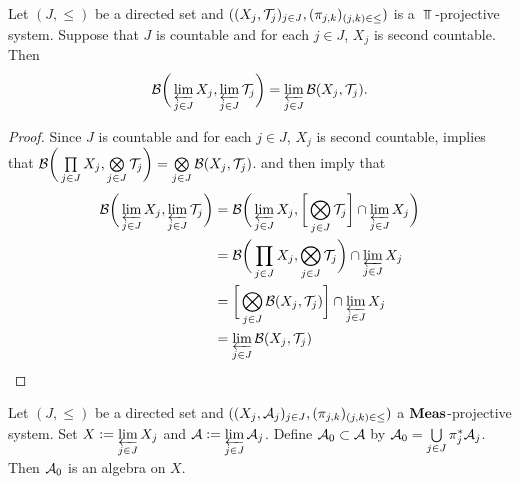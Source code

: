 \documentclass{book}
\begin{document}
\begin{ex} 
	Let $(J, \leq)$ be a directed set and $((X_j, \mathcal{T}_j)_{j \in J}, (\pi_{j,k})_{(j,k) \in \leq})$ is a $\Top$-projective system. Suppose that $J$ is countable and for each $j \in J$, $X_j$ is second countable. Then 
	$$\mathcal{B}\bigg(\varprojlim\limits_{j \in J} X_j, \varprojlim\limits_{j \in J} \mathcal{T}_j  \bigg) = \varprojlim\limits_{j \in J} \mathcal{B}(X_j, \mathcal{T}_j).$$
\end{ex}

\begin{proof}
	Since $J$ is countable and for each $j \in J$, $X_j$ is second countable,  implies that $\mathcal{B}\bigg(\prod\limits_{j \in J} X_j, \bigotimes\limits_{j \in J} \mathcal{T}_j \bigg) = \bigotimes\limits_{j \in J} \mathcal{B}(X_j, \mathcal{T}_j)$.  and  then imply that
	\begin{align*}
		\mathcal{B} \bigg(\varprojlim\limits_{j \in J} X_j, \varprojlim\limits_{j \in J} \mathcal{T}_j \bigg)
		& = \mathcal{B} \bigg(\varprojlim\limits_{j \in J} X_j, \bigg[ \bigotimes\limits_{j \in J} \mathcal{T}_j \bigg] \cap \varprojlim\limits_{j \in J} X_j \bigg) \\
		& = \mathcal{B}\bigg( \prod\limits_{j \in J} X_j, \bigotimes\limits_{j \in J} \mathcal{T}_j  \bigg) \cap \varprojlim\limits_{j \in J} X_j \\
		& = \bigg[ \bigotimes\limits_{j \in J} \mathcal{B}(X_j, \mathcal{T}_j)  \bigg] \cap \varprojlim\limits_{j \in J} X_j \\
		& = \varprojlim\limits_{j \in J} \mathcal{B}(X_j, \mathcal{T}_j)
	\end{align*} 
\end{proof}

\begin{ex} 
	Let $(J, {\leq})$ be a directed set and $((X_j, \mathcal{A}_j)_{j \in J}, (\pi_{j,k})_{(j,k) \in \leq})$ a $\operatorname*{\text{\textbf{Meas}}}$-projective system. Set $X \vcentcolon= \varprojlim\limits_{j \in J} X_j$ and $\mathcal{A} \vcentcolon= \varprojlim\limits_{j \in J} \mathcal{A}_j$. Define $\mathcal{A}_0 \subset \mathcal{A}$ by $\mathcal{A}_0 = \bigcup\limits_{j \in J} \pi_j^*\mathcal{A}_j$. Then $\mathcal{A}_0$ is an algebra on $X$. 
\end{ex}
\end{document}
